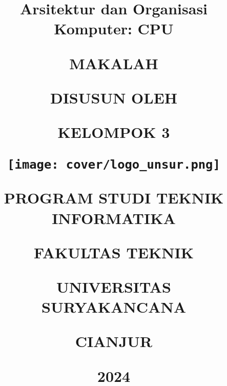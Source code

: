 \title{

  {\Huge{Arsitektur dan Organisasi Komputer: CPU}}

  {\large{MAKALAH}}

  {\normalsize{DISUSUN OLEH}}

  {\Large{KELOMPOK 3}}

  {\vspace{1cm}}
  {\texttt{[image: cover/logo\_unsur.png]}}
  {\vspace{1cm}}

  {\large{PROGRAM STUDI TEKNIK INFORMATIKA}}

  {\large{FAKULTAS TEKNIK}}

  {\large{UNIVERSITAS SURYAKANCANA}}

  {\large{CIANJUR}}

  {\small{2024}}
}
